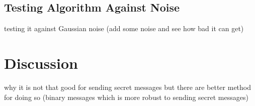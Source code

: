 \documentclass[12pt]{article}
\begin{document}
    \subsection{Testing Algorithm Against Noise}
    testing it against Gaussian noise (add some noise and see how bad it can get)
    \section{Discussion}
    why it is not that good for sending secret messages but there are better method for doing so (binary messages which is more robust to sending secret messages)
  \newpage    
    \printbibliography
\end{document}
